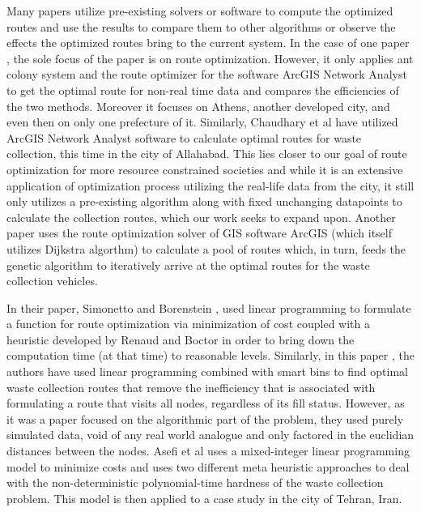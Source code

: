 \documentclass[12pt]{article}
\begin{document}
Many papers utilize pre-existing solvers or software to compute the optimized routes and use the results to compare them to other algorithms or observe the effects the optimized routes bring to the current system. In the case of one paper \cite{karadimas2008routing}, the sole focus of the paper is on route optimization. However, it only applies ant colony system and the route optimizer for the software ArcGIS Network Analyst to get the optimal route for non-real time data and compares the efficiencies of the two methods. Moreover it focuses on Athens, another developed city, and even then on only one prefecture of it. Similarly, Chaudhary et al \cite{chaudhary2019gis} have utilized ArcGIS Network Analyst software to calculate optimal routes for waste collection, this time in the city of Allahabad. This lies closer to our goal of route optimization for more resource constrained societies and while it is an extensive application of optimization process utilizing the real-life data from the city, it still only utilizes a pre-existing algorithm along with fixed unchanging datapoints to calculate the collection routes, which our work seeks to expand upon. Another paper \cite{amal2018sga} uses the route optimization solver of GIS software ArcGIS (which itself utilizes Dijkstra algorthm) to calculate a pool of routes which, in turn, feeds the genetic algorithm to iteratively arrive at the optimal routes for the waste collection vehicles.

In their paper, Simonetto and Borenstein \cite{de2007decision}, used linear programming to formulate a function for route optimization via minimization of cost coupled with a heuristic developed by Renaud and Boctor \cite{renaud2002sweep} in order to bring down the computation time (at that time) to reasonable levels. Similarly, in this paper \cite{hannan2020waste}, the authors have used linear programming combined with smart bins to find optimal waste collection routes that remove the inefficiency that is associated with formulating a route that visits all nodes, regardless of its fill status. However, as it was a paper focused on the algorithmic part of the problem, they used purely simulated data, void of any real world analogue and only factored in the euclidian distances between the nodes. Asefi et al \cite{asefi2019mathematical} uses a mixed-integer linear programming model to minimize costs and uses two different meta heuristic approaches to deal with the non-deterministic polynomial-time hardness of the waste collection problem. This model is then applied to a case study in the city of Tehran, Iran. 
\end{document}
